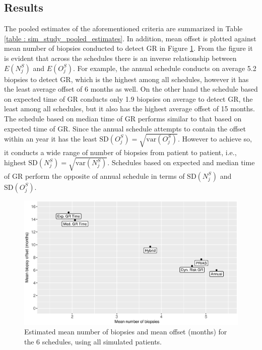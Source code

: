 \subsection{Results}
The pooled estimates of the aforementioned criteria are summarized in Table \ref{table : sim_study_pooled_estimates}. In addition, mean offset is plotted against mean number of biopsies conducted to detect GR in Figure \ref{fig : meanNbVsOffset}. From the figure it is evident that across the schedules there is an inverse relationship between $E(N^S_j)$ and $E(O^S_j)$. For example, the annual schedule conducts on average 5.2 biopsies to detect GR, which is the highest among all schedules, however it has the least average offset of 6 months as well. On the other hand the schedule based on expected time of GR conducts only 1.9 biopsies on average to detect GR, the least among all schedules, but it also has the highest average offset of 15 months. The schedule based on median time of GR performs similar to that based on expected time of GR. Since the annual schedule attempts to contain the offset within an year it has the least $\mbox{SD}(O^S_j) = \sqrt{\mbox{var}(O^S_j)}$. However to achieve so, it conducts a wide range of number of biopsies from patient to patient, i.e., highest $\mbox{SD}(N^S_j) = \sqrt{\mbox{var}(N^S_j)}$. Schedules based on expected and median time of GR perform the opposite of annual schedule in terms of $\mbox{SD}(N^S_j)$ and $\mbox{SD}(O^S_j)$.

\begin{figure}
\centerline{\includegraphics[width=\columnwidth]{images/sim_study/meanNbVsOffset_all.eps}}
\caption{Estimated mean number of biopsies and mean offset (months) for the 6 schedules, using all simulated patients.}
\label{fig : meanNbVsOffset}
\end{figure}

